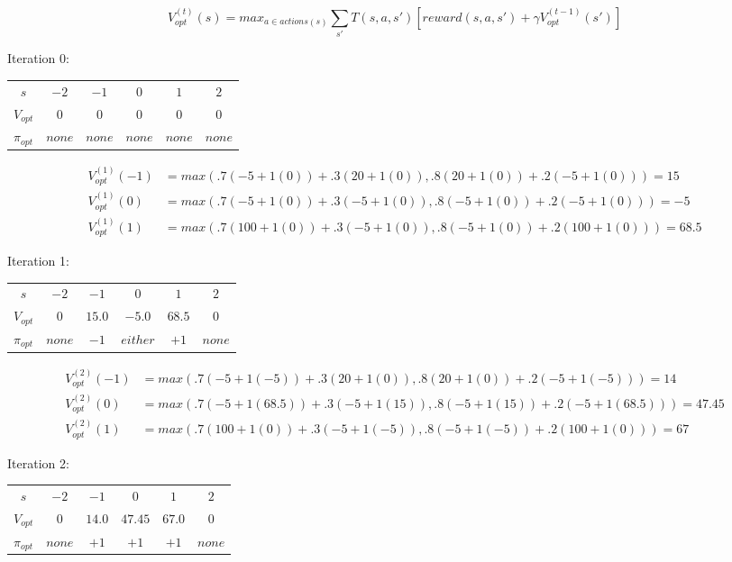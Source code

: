 \documentclass[10pt]{article}
\begin{document}
\begin{enumerate}[label=(\alph*)]
	$$V_{opt}^{(t)}(s) = max_{a \in actions(s)} \sum_{s'} T(s,a,s')[reward(s,a,s') + \gamma V_{opt}^{(t-1)}(s')]$$	
	
	Iteration 0:\\
	\begin{tabular}{c | c c c c c}
		$s$ & $-2$ & $-1$ & $0$ & $1$ & $2$ \\
  		$V_{opt}$ & $0$ & $0$ & $0$ & $0$ & $0$ \\
  		$\pi_{opt}$ & $none$ & $none$ & $none$ & $none$ & $none$ \\
	\end{tabular}
  
  \begin{align*}
  		V_{opt}^{(1)}(-1) &= max(.7(-5 + 1(0)) + .3(20 + 1(0)), .8(20 + 1(0)) + .2(-5 + 1(0))) = 15\\
  		V_{opt}^{(1)}(0) &= max(.7(-5 + 1(0)) + .3(-5 + 1(0)), .8(-5 + 1(0)) + .2(-5 + 1(0))) = -5\\
  		V_{opt}^{(1)}(1) &= max(.7(100 + 1(0)) + .3(-5 + 1(0)), .8(-5 + 1(0)) + .2(100 + 1(0))) = 68.5
	\end{align*}
	
	Iteration 1:\\
	\begin{tabular}{c | c c c c c}
		$s$ & $-2$ & $-1$ & $0$ & $1$ & $2$ \\
  		$V_{opt}$ & $0$ & $15.0$ & $-5.0$ & $68.5$ & $0$ \\
  		$\pi_{opt}$ & $none$ & $-1$ & $either$ & $+1$ & $none$ \\
	\end{tabular}
	
	\begin{align*}
  		V_{opt}^{(2)}(-1) &= max(.7(-5 + 1(-5)) + .3(20 + 1(0)), .8(20 + 1(0)) + .2(-5 + 1(-5))) = 14\\
  		V_{opt}^{(2)}(0) &= max(.7(-5 + 1(68.5)) + .3(-5 + 1(15)), .8(-5 + 1(15)) + .2(-5 + 1(68.5))) = 47.45\\
  		V_{opt}^{(2)}(1) &= max(.7(100 + 1(0)) + .3(-5 + 1(-5)), .8(-5 + 1(-5)) + .2(100 + 1(0))) = 67
	\end{align*}
	
	Iteration 2:\\
	\begin{tabular}{c | c c c c c}
		$s$ & $-2$ & $-1$ & $0$ & $1$ & $2$ \\
  		$V_{opt}$ & $0$ & $14.0$ & $47.45$ & $67.0$ & $0$ \\
  		$\pi_{opt}$ & $none$ & $+1$ & $+1$ & $+1$ & $none$ \\
  	\end{tabular}

\end{enumerate}
\end{document}
